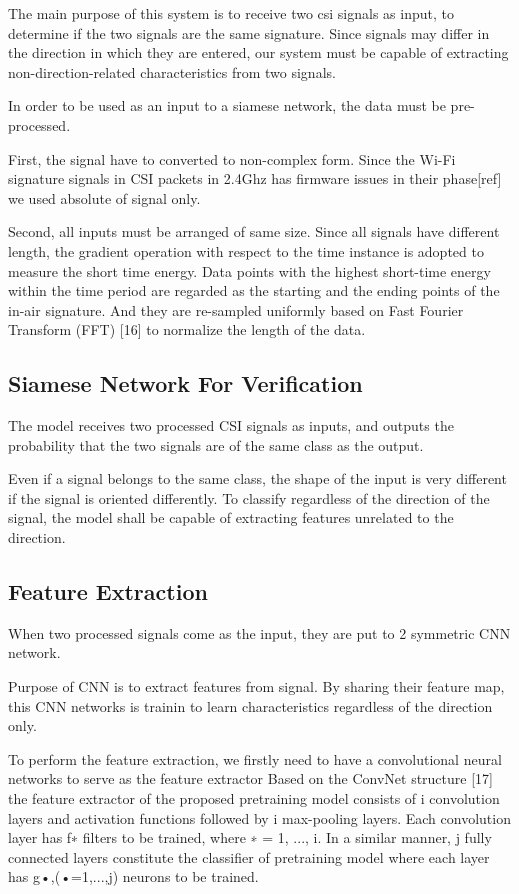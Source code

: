 \documentclass[runningheads]{llncs}
\begin{document}
The main purpose of this system is to receive two csi signals as input, to determine if the two signals are the same signature.
Since signals may differ in the direction in which they are entered, our system must be capable of extracting non-direction-related characteristics from two signals.

In order to be used as an input to a siamese network, the data must be pre-processed.

First, the signal have to converted to non-complex form.
Since the Wi-Fi signature signals in CSI packets in 2.4Ghz has firmware issues in their phase[ref] we used absolute of signal only.

Second, all inputs must be arranged of same size.
Since all signals have different length, the gradient operation with respect to the time instance is adopted to measure the short time energy. 
Data points with the highest short-time energy within the time period are regarded as the starting and the ending points of the in-air signature.
And they are re-sampled uniformly based on Fast Fourier Transform (FFT) [16] to normalize the length of the data. 

\subsection{Siamese Network For Verification}
The model receives two processed CSI signals as inputs, and outputs the probability that the two signals are of the same class as the output.

Even if a signal belongs to the same class, the shape of the input is very different if the signal is oriented differently.
To classify regardless of the direction of the signal, the model shall be capable of extracting features unrelated to the direction.
\subsection{Feature Extraction}
When two processed signals come as the input, they are put to 2 symmetric CNN network.

Purpose of CNN is to extract features from signal.
By sharing their feature map, this CNN networks is trainin to learn characteristics regardless of the direction only.

To perform the feature extraction, we firstly need to have a convolutional neural networks  to serve as the feature extractor
Based on the ConvNet structure [17] the feature extractor of the proposed pretraining model consists of i convolution layers and activation functions followed by i max-pooling layers. Each convolution layer has f∗ filters to be trained, where ∗ = 1, ..., i. In a similar manner, j fully connected layers constitute the classifier of pretraining model where each layer has g•,(•=1,...,j) neurons to be trained. 
\end{document}

